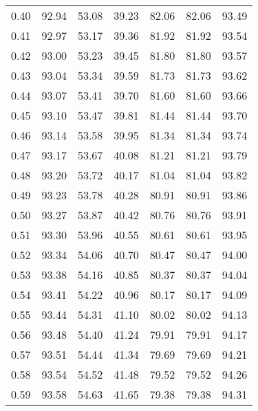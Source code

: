 \begin{tabular}{|c|c|c|c|c|c|c|}
      0.40 &     92.94 &     53.08 &      39.23 &   82.06 &      82.06 &         93.49 \\
      0.41 &     92.97 &     53.17 &      39.36 &   81.92 &      81.92 &         93.54 \\
      0.42 &     93.00 &     53.23 &      39.45 &   81.80 &      81.80 &         93.57 \\
      0.43 &     93.04 &     53.34 &      39.59 &   81.73 &      81.73 &         93.62 \\
      0.44 &     93.07 &     53.41 &      39.70 &   81.60 &      81.60 &         93.66 \\
      0.45 &     93.10 &     53.47 &      39.81 &   81.44 &      81.44 &         93.70 \\
      0.46 &     93.14 &     53.58 &      39.95 &   81.34 &      81.34 &         93.74 \\
      0.47 &     93.17 &     53.67 &      40.08 &   81.21 &      81.21 &         93.79 \\
      0.48 &     93.20 &     53.72 &      40.17 &   81.04 &      81.04 &         93.82 \\
      0.49 &     93.23 &     53.78 &      40.28 &   80.91 &      80.91 &         93.86 \\
      0.50 &     93.27 &     53.87 &      40.42 &   80.76 &      80.76 &         93.91 \\
      0.51 &     93.30 &     53.96 &      40.55 &   80.61 &      80.61 &         93.95 \\
      0.52 &     93.34 &     54.06 &      40.70 &   80.47 &      80.47 &         94.00 \\
      0.53 &     93.38 &     54.16 &      40.85 &   80.37 &      80.37 &         94.04 \\
      0.54 &     93.41 &     54.22 &      40.96 &   80.17 &      80.17 &         94.09 \\
      0.55 &     93.44 &     54.31 &      41.10 &   80.02 &      80.02 &         94.13 \\
      0.56 &     93.48 &     54.40 &      41.24 &   79.91 &      79.91 &         94.17 \\
      0.57 &     93.51 &     54.44 &      41.34 &   79.69 &      79.69 &         94.21 \\
      0.58 &     93.54 &     54.52 &      41.48 &   79.52 &      79.52 &         94.26 \\
      0.59 &     93.58 &     54.63 &      41.65 &   79.38 &      79.38 &         94.31 \\

\end{tabular}
